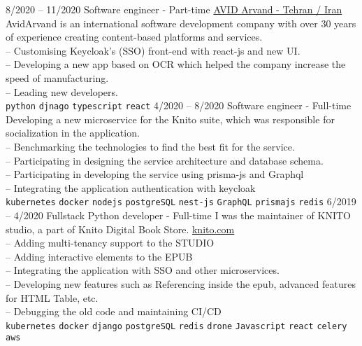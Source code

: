 \documentclass[9pt]{developercv}
\begin{document}
\begin{entrylist}
	\entry
	{8/2020 -- 11/2020}
	{Software engineer - Part-time}
	{
		\href{https://www.linkedin.com/company/avid-technology-development/}{AVID Arvand - Tehran / Iran}}
	{
		AvidArvand is an international software development company with over 30 years of experience creating content-based platforms and services. \\
		-- Customising Keycloak's (SSO) front-end with react-js and new UI. \\
		-- Developing a new app based on OCR which helped
		the company increase the speed of manufacturing. \\
		-- Leading new developers. \\
		\texttt{python}\slashsep
		\texttt{djnago}\slashsep
		\texttt{typescript}\slashsep
		\texttt{react}\slashsep
	}
	\entry
	{4/2020 -- 8/2020}
	{Software engineer - Full-time}
	{}
	{
		Developing a new microservice for the Knito suite, which was responsible for socialization in the application.\\
		-- Benchmarking the technologies to find the best fit for the service. \\
		-- Participating in designing the service architecture and database schema. \\
		-- Participating in developing the service using prisma-js and Graphql \\
		-- Integrating the application authentication with keycloak \\
		\texttt{kubernetes}\slashsep
		\texttt{docker}\slashsep
		\texttt{nodejs}\slashsep
		\texttt{postgreSQL}\slashsep
		\texttt{nest-js}\slashsep
		\texttt{GraphQL}\slashsep
		\texttt{prismajs}\slashsep
		\texttt{redis}\slashsep
	}
	\entry
	{6/2019 -- 4/2020}
	{Fullstack Python developer - Full-time}
	{}
	{
		I was the maintainer of KNITO studio, a part of Knito Digital Book Store.
		\href{https://knito.com/}{knito.com} \\
		-- Adding multi-tenancy support to the STUDIO \\
		-- Adding interactive elements to the EPUB \\
		-- Integrating the application with SSO and other microservices. \\
		-- Developing new features such as Referencing inside the epub, advanced features for HTML Table, etc. \\
		-- Debugging the old code and maintaining CI/CD \\
		\texttt{kubernetes}\slashsep
		\texttt{docker}\slashsep
		\texttt{django}\slashsep
		\texttt{postgreSQL}\slashsep
		\texttt{redis}\slashsep
		\texttt{drone}\slashsep
		\texttt{Javascript}\slashsep
		\texttt{react}\slashsep
		\texttt{celery}\slashsep
		\texttt{aws}\slashsep
	}
\end{entrylist}
\end{document}
